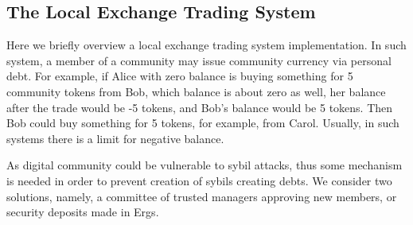 \subsection{The Local Exchange Trading System}
 \label{sec:platform}

 Here we briefly overview a local exchange trading system implementation. In such system, a member of a community may
 issue community currency via personal debt. For example, if Alice with zero balance is buying something for 5
 community tokens from Bob, which balance is about zero as well, her balance after the trade would be -5 tokens, and
 Bob's balance would be 5 tokens. Then Bob could buy something for 5 tokens, for example, from Carol. Usually, in such
 systems there is a limit for negative balance.

 As digital community could be vulnerable to sybil attacks, thus some mechanism is needed in order to prevent creation
 of sybils creating debts. We consider two solutions, namely, a committee of trusted managers approving new members,
 or security deposits made in Ergs.

